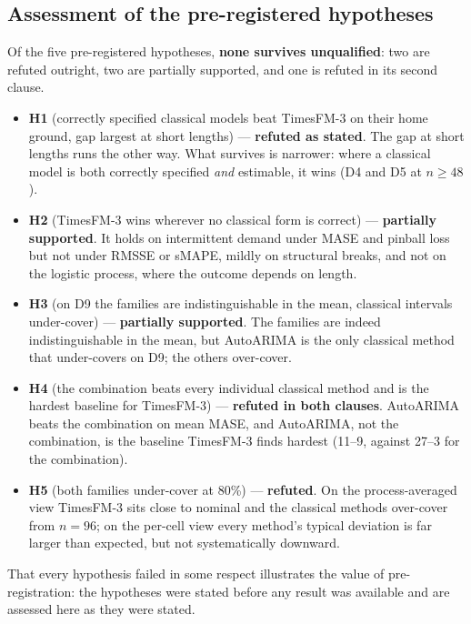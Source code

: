 \documentclass[11pt]{article}
\begin{document}
\subsection{Assessment of the pre-registered hypotheses}
\label{sec:hypotheses}

Of the five pre-registered hypotheses, \textbf{none survives unqualified}: two are refuted
outright, two are partially supported, and one is refuted in its second clause.

\begin{itemize}
\item \textbf{H1} (correctly specified classical models beat TimesFM-3 on their home ground,
      gap largest at short lengths) --- \textbf{refuted as stated}. The gap at short lengths runs
      the other way. What survives is narrower: where a classical model is both correctly
      specified \emph{and} estimable, it wins (D4 and D5 at $n \geq 48$).
\item \textbf{H2} (TimesFM-3 wins wherever no classical form is correct) ---
      \textbf{partially supported}. It holds on intermittent demand under MASE and pinball loss
      but not under RMSSE or sMAPE, mildly on structural breaks, and not on the logistic process,
      where the outcome depends on length.
\item \textbf{H3} (on D9 the families are indistinguishable in the mean, classical intervals
      under-cover) --- \textbf{partially supported}. The families are indeed indistinguishable in
      the mean, but AutoARIMA is the only classical method that under-covers on D9; the others
      over-cover.
\item \textbf{H4} (the combination beats every individual classical method and is the hardest
      baseline for TimesFM-3) --- \textbf{refuted in both clauses}. AutoARIMA beats the
      combination on mean MASE, and AutoARIMA, not the combination, is the baseline TimesFM-3
      finds hardest (11--9, against 27--3 for the combination).
\item \textbf{H5} (both families under-cover at 80\%) --- \textbf{refuted}. On the
      process-averaged view TimesFM-3 sits close to nominal and the classical methods over-cover
      from $n = 96$; on the per-cell view every method's typical deviation is far larger
      than expected, but not systematically downward.
\end{itemize}

That every hypothesis failed in some respect illustrates the value of pre-registration: the
hypotheses were stated before any result was available and are assessed here as they were stated.
\end{document}
